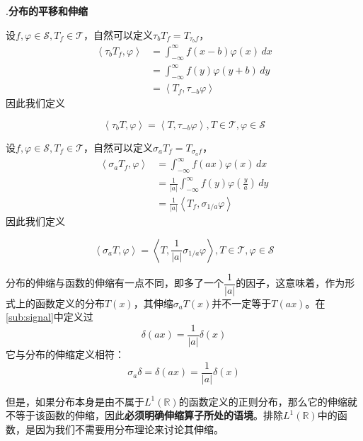 \documentclass{ctexbook}
\begin{document}
.\textbf{分布的平移和伸缩}

设$f,\varphi\in\mathcal{S} ,T_f\in\mathcal{T} $，自然可以定义$\tau_b T_f=T_{\tau_b f}$，
\begin{align*}
    \left\langle \tau_b T_f,\varphi\right\rangle & =\int_{-\infty}^{\infty}f(x-b)\varphi(x)\,dx \\
                                      & =\int_{-\infty}^{\infty}f(y)\varphi(y+b)\,dy \\
                                      & =\left\langle T_f,\tau_{-b}\varphi\right\rangle
\end{align*}
因此我们定义\begin{definition}[分布的平移]
    \begin{equation*}
    \left\langle \tau_b T,\varphi\right\rangle=\left\langle T,\tau_{-b}\varphi\right\rangle,T\in\mathcal{T} ,\varphi\in\mathcal{S}
\end{equation*}
\end{definition}

设$f,\varphi\in\mathcal{S} ,T_f\in\mathcal{T} $，自然可以定义$\sigma_a T_f=T_{\sigma_a f}$，
\begin{align*}
    \left\langle \sigma_a T_f,\varphi\right\rangle & =\int_{-\infty}^{\infty}f(ax)\varphi(x)\,dx                                  \\
                                        & =\frac{1}{|a|}\int_{-\infty}^{\infty}f(y)\varphi\left(\frac{y}{a}\right)\,dy \\
                                        & =\frac{1}{|a|}\left\langle T_f,\sigma_{1/a}\varphi\right\rangle
\end{align*}
因此我们定义\begin{definition}[分布的伸缩]
    \begin{equation*}
    \left\langle\sigma_a T,\varphi\right\rangle=\left\langle T,\frac{1}{|a|}\sigma_{1/a}\varphi\right\rangle,T\in\mathcal{T} ,\varphi\in\mathcal{S}
\end{equation*}
\end{definition}

分布的伸缩与函数的伸缩有一点不同，即多了一个$\dfrac{1}{|a|}$的因子，这意味着，作为形式上的函数定义的分布$T(x)$，其伸缩$\sigma_a T(x)$并不一定等于$T(ax)$。在\ref{sub:signal}中定义过
$$\delta(ax)=\dfrac{1}{|a|}\delta(x)$$
它与分布的伸缩定义相符：
$$\sigma_a\delta=\delta(ax)=\frac{1}{|a|}\delta(x)$$

但是，如果分布本身是由不属于$L^1(\mathbb{R})$的函数定义的正则分布，那么它的伸缩就不等于该函数的伸缩，因此\textbf{必须明确伸缩算子所处的语境}。排除$L^1(\mathbb{R})$中的函数，是因为我们不需要用分布理论来讨论其伸缩。
\end{document}
